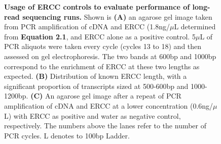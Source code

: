 \begin{figure}[!htp]
\begin{center}
	\end{center}
	\captionsetup{width=0.95\textwidth}
	\caption[Usage of ERCC controls to evaluate performance of long-read sequencing runs]%
	{\textbf{Usage of ERCC controls to evaluate performance of long-read sequencing runs.} Shown is \textbf{(A)} an agarose gel image taken from PCR amplification of cDNA and ERCC (1.8ng/$\mu$L determined from \textbf{Equation 2.1}, and ERCC alone as a positive control. 5$\mu$L of PCR aliquots were taken every cycle (cycles 13 to 18) and then assessed on gel electrophoresis. The two bands at 600bp and 1000bp correspond to the enrichment of ERCC at these two lengths as expected. \textbf{(B)} Distribution of known ERCC length, with a significant proportion of transcripts sized at 500-600bp and 1000-1200bp. \textbf{(C)} An agarose gel image after a repeat of PCR amplification of cDNA and ERCC at a lower concentration (0.6ng/$\mu$L) with ERCC as positive and water as negative control, respectively. The numbers above the lanes refer to the number of PCR cycles. L denotes to 100bp Ladder.}
	\label{fig:ercc_lab_gel}
\end{figure}
 
